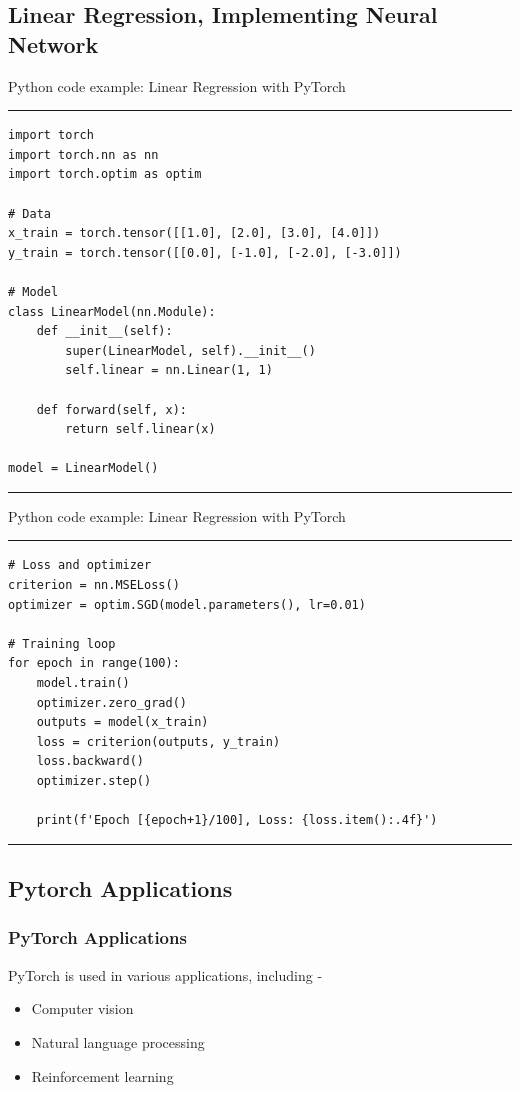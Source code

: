 \documentclass[aspectratio=169, hideothersubsections]{beamer}
\begin{document}
\subsection{Linear Regression, Implementing Neural Network}
\begin{frame}[fragile]{Python code example: Linear Regression with PyTorch}
\rule{\textwidth}{1pt}
\scriptsize
\begin{verbatim}
import torch
import torch.nn as nn
import torch.optim as optim

# Data
x_train = torch.tensor([[1.0], [2.0], [3.0], [4.0]])
y_train = torch.tensor([[0.0], [-1.0], [-2.0], [-3.0]])

# Model
class LinearModel(nn.Module):
    def __init__(self):
        super(LinearModel, self).__init__()
        self.linear = nn.Linear(1, 1)

    def forward(self, x):
        return self.linear(x)

model = LinearModel()
\end{verbatim}
\rule{\textwidth}{1pt}
\end{frame}

\begin{frame}[fragile]{Python code example: Linear Regression with PyTorch}
\rule{\textwidth}{1pt}
\scriptsize
\begin{verbatim}
# Loss and optimizer
criterion = nn.MSELoss()
optimizer = optim.SGD(model.parameters(), lr=0.01)

# Training loop
for epoch in range(100):
    model.train()
    optimizer.zero_grad()
    outputs = model(x_train)
    loss = criterion(outputs, y_train)
    loss.backward()
    optimizer.step()

    print(f'Epoch [{epoch+1}/100], Loss: {loss.item():.4f}')
\end{verbatim}
\rule{\textwidth}{1pt}
\end{frame}

\subsection{Pytorch Applications}
\begin{frame}
\frametitle{PyTorch Applications}
PyTorch is used in various applications, including -
\begin{itemize}
    \item Computer vision
    \item Natural language processing
    \item Reinforcement learning
\end{itemize}
\end{frame}
\end{document}
